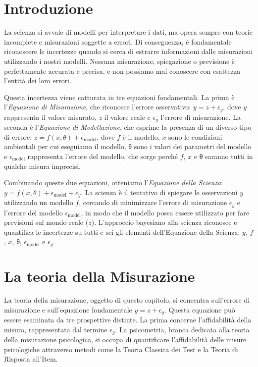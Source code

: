 \documentclass[
  letterpaper,
  DIV=11,
  numbers=noendperiod]{scrreprt}
\theoremstyle{definition}
\theoremstyle{remark}
\begin{document}
\section{Introduzione}\label{introduzione-3}

La scienza si avvale di modelli per interpretare i dati, ma opera sempre
con teorie incomplete e misurazioni soggette a errori. Di conseguenza, è
fondamentale riconoscere le incertezze quando si cerca di estrarre
informazioni dalle misurazioni utilizzando i nostri modelli. Nessuna
misurazione, spiegazione o previsione è perfettamente accurata e
precisa, e non possiamo mai conoscere con esattezza l'entità dei loro
errori.

Questa incertezza viene catturata in tre equazioni fondamentali. La
prima è l'\emph{Equazione di Misurazione}, che riconosce l'errore
osservativo: \(y = z + ϵ_y\), dove \(y\) rappresenta il valore misurato,
\(z\) il valore reale e \(ϵ_y\) l'errore di misurazione. La seconda è
l'\emph{Equazione di Modellazione}, che esprime la presenza di un
diverso tipo di errore: \(z = f(x,θ) + ϵ_\text{model}\), dove \(f\) è il
modello, \(x\) sono le condizioni ambientali per cui eseguiamo il
modello, θ sono i valori dei parametri del modello e \(ϵ_\text{model}\)
rappresenta l'errore del modello, che sorge perché \(f\), \(x\) e θ
saranno tutti in qualche misura imprecisi.

Combinando queste due equazioni, otteniamo l'\emph{Equazione della
Scienza}: \(y = f(x,θ) + ϵ_\text{model} + ϵ_y\). La scienza è il
tentativo di spiegare le osservazioni \(y\) utilizzando un modello
\(f\), cercando di minimizzare l'errore di misurazione \(ϵ_y\) e
l'errore del modello \(ϵ_\text{model}\), in modo che il modello possa
essere utilizzato per fare previsioni sul mondo reale (\(z\)).
L'approccio bayesiano alla scienza riconosce e quantifica le incertezze
su tutti e sei gli elementi dell'Equazione della Scienza: \(y\), \(f\),
\(x\), θ, \(ϵ_\text{model}\) e \(ϵ_y\).

\section{La teoria della Misurazione}\label{la-teoria-della-misurazione}

La teoria della misurazione, oggetto di questo capitolo, si concentra
sull'errore di misurazione e sull'equazione fondamentale
\(y = z + ϵ_y\). Questa equazione può essere esaminata da tre
prospettive distinte. La prima concerne l'affidabilità della misura,
rappresentata dal termine \(ϵ_y\). La psicometria, branca dedicata alla
teoria della misurazione psicologica, si occupa di quantificare
l'affidabilità delle misure psicologiche attraverso metodi come la
Teoria Classica dei Test e la Teoria di Risposta all'Item.
\end{document}
